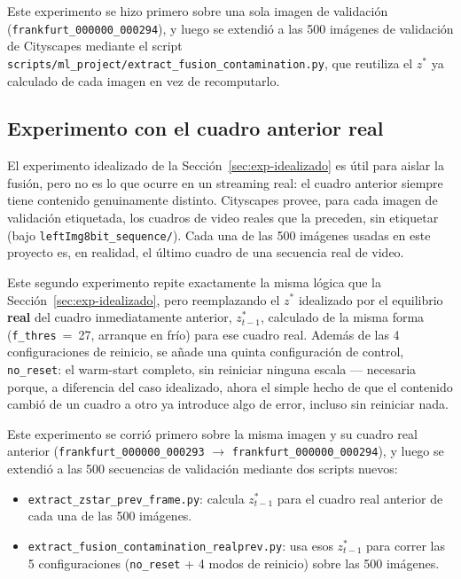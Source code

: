 \documentclass[11pt,a4paper]{article}
\newcommand{\code}[1]{\texttt{#1}}
\begin{document}
Este experimento se hizo primero sobre una sola imagen de validación
(\code{frankfurt\_000000\_000294}), y luego se extendió a las 500 imágenes de validación de
Cityscapes mediante el script \code{scripts/ml\_project/extract\_fusion\_contamination.py}, que
reutiliza el $z^*$ ya calculado de cada imagen en vez de recomputarlo.

\subsection{Experimento con el cuadro anterior real}
\label{sec:exp-real}

El experimento idealizado de la Sección~\ref{sec:exp-idealizado} es útil para aislar la fusión,
pero no es lo que ocurre en un streaming real: el cuadro anterior siempre tiene contenido
genuinamente distinto. Cityscapes provee, para cada imagen de validación etiquetada, los cuadros de
video reales que la preceden, sin etiquetar (bajo \code{leftImg8bit\_sequence/}). Cada una de las
500 imágenes usadas en este proyecto es, en realidad, el último cuadro de una secuencia real de
video.

Este segundo experimento repite exactamente la misma lógica que la Sección~\ref{sec:exp-idealizado},
pero reemplazando el $z^*$ idealizado por el equilibrio \textbf{real} del cuadro inmediatamente
anterior, $z^*_{t-1}$, calculado de la misma forma (\code{f\_thres}~=~27, arranque en frío) para ese
cuadro real. Además de las 4 configuraciones de reinicio, se añade una quinta configuración de
control, \code{no\_reset}: el warm-start completo, sin reiniciar ninguna escala --- necesaria
porque, a diferencia del caso idealizado, ahora el simple hecho de que el contenido cambió de un
cuadro a otro ya introduce algo de error, incluso sin reiniciar nada.

Este experimento se corrió primero sobre la misma imagen y su cuadro real anterior
(\code{frankfurt\_000000\_000293} $\to$ \code{frankfurt\_000000\_000294}), y luego se extendió a
las 500 secuencias de validación mediante dos scripts nuevos:
\begin{itemize}
  \item \code{extract\_zstar\_prev\_frame.py}: calcula $z^*_{t-1}$ para el cuadro real anterior de
    cada una de las 500 imágenes.
  \item \code{extract\_fusion\_contamination\_realprev.py}: usa esos $z^*_{t-1}$ para correr las 5
    configuraciones (\code{no\_reset} + 4 modos de reinicio) sobre las 500 imágenes.
\end{itemize}
\end{document}
